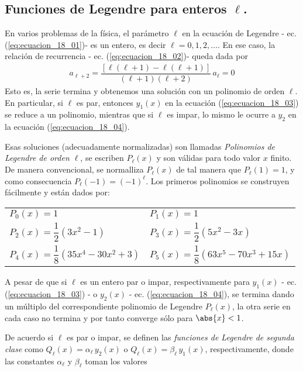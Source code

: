 \subsection{Funciones de Legendre para enteros $\ell$.}
En varios problemas de la física, el parámetro $\ell$ en la ecuación de Legendre - ec. (\ref{eq:ecuacion_18_01})- es un entero, es decir $\ell = 0, 1, 2, \ldots$. En ese caso, la relación de recurrencia - ec. (\ref{eq:ecuacion_18_02})- queda dada por
\begin{align*}
a_{\ell + 2} = \dfrac{[ \ell (\ell + 1) - \ell (\ell + 1) ]}{(\ell + 1)(\ell + 2)}  \, a_{\ell} = 0
\end{align*}
Esto es, la serie termina y obtenemos una solución con un polinomio de orden $\ell$. En particular, si $\ell$ es par, entonces $y_{1}(x)$ en la ecuación (\ref{eq:ecuacion_18_03}) se reduce a un polinomio, mientras que si $\ell$ es impar, lo mismo le ocurre a $y_{2}$ en la ecuación (\ref{eq:ecuacion_18_04}).
\par
Esas soluciones (adecuadamente normalizadas) son llamadas \emph{Polinomios de Legendre de orden $\ell$}, se escriben $P_{\ell}(x)$ y son válidas para todo valor $x$ finito. De manera convencional, se normalliza $P_{\ell}(x)$ de tal manera que $P_{\ell}(1) =  1$, y como consecuencia $P_{\ell}(-1) = (-1)^{\ell}$. Los primeros polinomios se construyen fácilmente y están dados por:
\begingroup
\setlength{\tabcolsep}{20pt}
\renewcommand{\arraystretch}{2}
\begin{center}
\begin{tabular}{l l}
$P_{0}(x) = 1 $ & $P_{1}(x) = 1 $ \\
$P_{2}(x) = \dfrac{1}{2} (3 x^{2} - 1)$ & $P_{3}(x) = \dfrac{1}{2} (5 x^{2} - 3 x)$ \\ 
$P_{4}(x) = \dfrac{1}{8} (35 x^{4} - 30 x^{2} + 3)$ & $P_{5}(x) = \dfrac{1}{8} (63 x^{5} - 70 x^{3} + 15 x)$
\end{tabular}
\end{center}
\endgroup
A pesar de que si $\ell$ es un entero par o impar, respectivamente para $y_{1}(x)$ - ec. (\ref{eq:ecuacion_18_03}) - o $y_{2}(x)$ - ec. (\ref{eq:ecuacion_18_04}), se termina dando un múltiplo del correspondiente polinomio de Legendre $P_{\ell}(x)$, la otra serie en cada caso no termina y por tanto converge sólo para $\abs{x} < 1$.
\par
De acuerdo si $\ell$ es par o impar, se definen las \emph{funciones de Legendre de segunda clase} como $Q_{\ell}(x) =  \alpha_{\ell} \, y_{2}(x)$ o $Q_{\ell}(x) = \beta_{\ell} \, y_{1}(x)$, respectivamente, donde las constantes $\alpha_{\ell}$ y $\beta_{\ell}$ toman los valores
